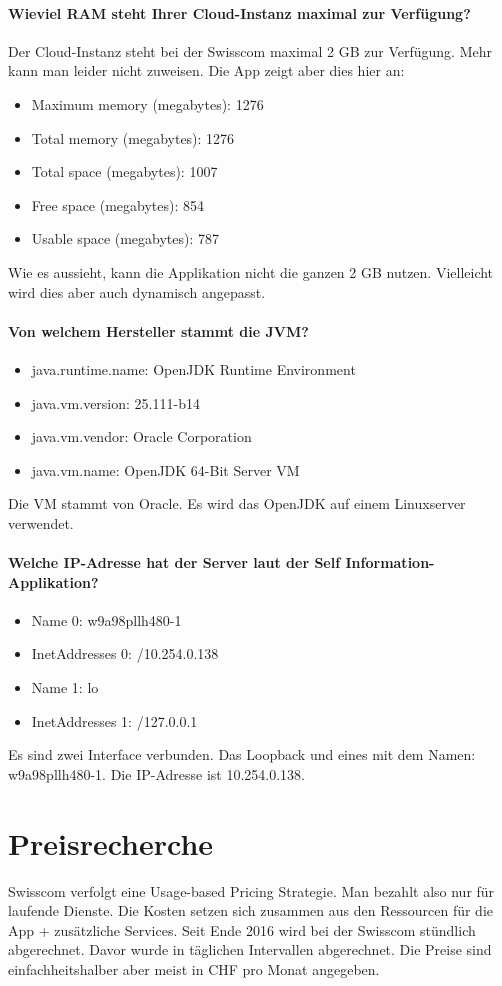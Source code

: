 \subsubsection{Wieviel RAM steht Ihrer Cloud-Instanz maximal zur Verfügung?}
Der Cloud-Instanz steht bei der Swisscom maximal 2 GB zur Verfügung. Mehr kann man leider nicht zuweisen.
Die App zeigt aber dies hier an:
\begin{itemize}
\item		Maximum memory (megabytes): 1276
\item		Total memory (megabytes): 1276
\item		Total space (megabytes): 1007
\item		Free space (megabytes): 854
\item		Usable space (megabytes): 787
\end{itemize}
Wie es aussieht, kann die Applikation nicht die ganzen 2 GB nutzen. Vielleicht wird dies aber auch dynamisch angepasst.
\subsubsection{Von welchem Hersteller stammt die JVM?}
\begin{itemize}
\item		java.runtime.name: OpenJDK Runtime Environment
\item		java.vm.version: 25.111-b14
\item		java.vm.vendor: Oracle Corporation
\item		java.vm.name: OpenJDK 64-Bit Server VM
\end{itemize}
Die VM stammt von Oracle. Es wird das OpenJDK auf einem Linuxserver verwendet.
\subsubsection{Welche IP-Adresse hat der Server laut der Self Information-Applikation?}
\begin{itemize}
\item		Name 0: w9a98pllh480-1
\item		InetAddresses 0: /10.254.0.138
\item		Name 1: lo
\item		InetAddresses 1: /127.0.0.1
\end{itemize}
Es sind zwei Interface verbunden. Das Loopback und eines mit dem Namen: w9a98pllh480-1. Die IP-Adresse ist 10.254.0.138. 
\chapter{Preisrecherche}
Swisscom verfolgt eine Usage-based Pricing Strategie. Man bezahlt also nur für laufende Dienste. Die Kosten setzen sich zusammen aus den Ressourcen für die App + zusätzliche Services. Seit Ende 2016 wird bei der Swisscom stündlich abgerechnet. Davor wurde in täglichen Intervallen abgerechnet. Die Preise sind einfachheitshalber aber meist in CHF pro Monat angegeben. 

